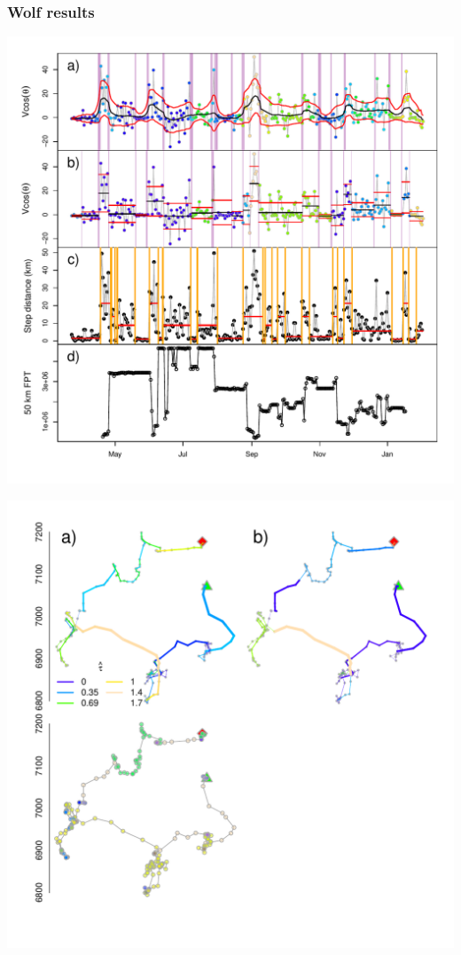 \documentclass[10pt]{article}\usepackage{graphicx, color}
\newenvironment{knitrout}{}{} %
\newcommand{\bc}{\begin{center}}
\newcommand{\ec}{\end{center}}
\begin{document}
\subsubsection{Wolf results}
\bc
\begin{knitrout}
\color{fgcolor}
\includegraphics[width=.7\textwidth]{figure/WolfResults1} 

\includegraphics[width=.7\textwidth]{figure/WolfResults2} 

\end{knitrout}

\ec
\clearpage
\end{document}

